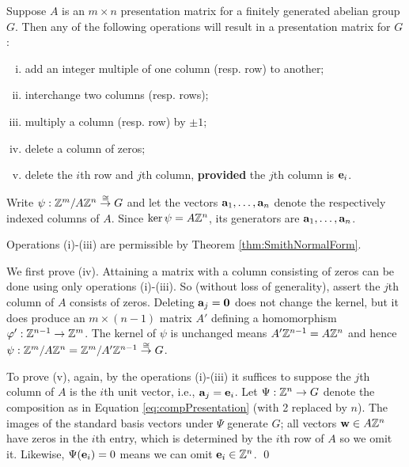 \documentclass[../algebraNotesMSRI-UP2016.tex]{subfiles}
\begin{document}
\begin{frame}
\begin{prop}\label{prop:allOperations}
Suppose $A$ is an $m\times n$ presentation matrix for a finitely generated abelian group $G$.  Then any of the following operations will result in a presentation matrix for $G$:
\begin{enumerate}[(i)]
\item add an integer multiple of one column (resp. row) to another;
\item interchange two columns (resp. rows);
\item multiply a column (resp. row) by $\pm 1$; 
\item delete a column 
of zeros;
\item delete the $i$th row and $j$th column, \textbf{provided} the $j$th column is $\mathbf e_i$. %
\end{enumerate}
\end{prop}
\end{frame}

\begin{frame}
\bigProof
Write $\psi:\mathbb Z^m/A\mathbb Z^n\overset{\cong}{\to}G$ and let the vectors $\mathbf a_1,\dots,\mathbf a_n$ denote the respectively indexed columns of $A$.  Since $\ker{\psi}=A\mathbb Z^n$, its generators are $\mathbf a_1,\dots, \mathbf a_n$.

\smallGap 
Operations {(i)}-{(iii)} are permissible by Theorem \ref{thm:SmithNormalForm}.  

\smallGap
We first prove {(iv)}.  Attaining a matrix with a column consisting of zeros can be done using only operations {(i)}-{(iii)}.  So  (without loss of generality), assert the $j$th column of $A$ consists of zeros.  Deleting $\mathbf a_j=\mathbf 0$ does not change the kernel, but it does produce an $m\times (n-1)$ matrix $A'$ defining a homomorphism $\varphi':\mathbb Z^{n-1}\to \mathbb Z^m$.  The kernel of $\psi$ is unchanged means $A'\mathbb Z^{n-1}=A\mathbb Z^n$ and hence $\psi: \mathbb Z^m/A\mathbb Z^n=\mathbb Z^m/A'\mathbb Z^{n-1}\overset{\cong}{\to} G$.
\end{frame}

\begin{frame}[c]
To prove {(v)}, again, by the operations {(i)}-{(iii)} it suffices to suppose the $j$th column of $A$ is the $i$th unit vector, i.e., $\mathbf a_j=\mathbf e_i$.  Let $\Psi:\mathbb Z^n\to G$ denote the composition as in Equation \eqref{eq:compPresentation} (with 2 replaced by $n$).  The images of the standard basis vectors under $\Psi$ generate $G$; all vectors $\mathbf w\in A\mathbb Z^n$ have zeros in the $i$th entry, which is determined by the $i$th row of $A$ so we omit it.  Likewise, $\Psi({\mathbf e_i})=0$ means we can omit $\mathbf e_i\in \mathbb Z^n$.
\qed
\end{frame}
\end{document}
